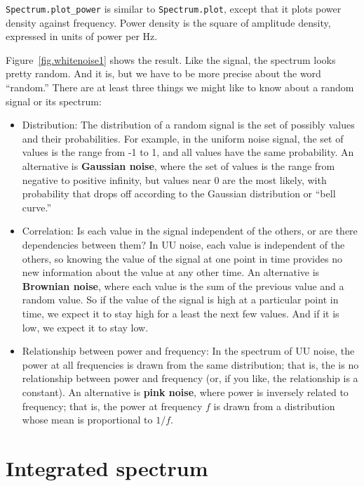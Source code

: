 \documentclass[12pt]{book}
\begin{document}
\verb"Spectrum.plot_power" is similar to \verb"Spectrum.plot",
except that it plots power density against frequency.  Power density
is the square of amplitude density, expressed in units of power per Hz.

Figure~\ref{fig.whitenoise1} shows the result.  Like the signal, the
spectrum looks pretty random.  And it is, but we have to be more
precise about the word ``random.''  There are at least three things we
might like to know about a random signal or its spectrum:

\begin{itemize}

\item Distribution: The distribution of a random signal is the set of
  possibly values and their probabilities.  For example, in the
  uniform noise signal, the set of values is the range from -1 to 1,
  and all values have the same probability.  An alternative is
  {\bf Gaussian noise}, where the set of values is the range from negative
  to positive infinity, but values near 0 are the most likely, with
  probability that drops off according to the Gaussian distribution or
  ``bell curve.''

\item Correlation: Is each value in the signal independent of the
  others, or are there dependencies between them?  In UU noise, each
  value is independent of the others, so knowing the value of the
  signal at one point in time provides no new information about the
  value at any other time.  An alternative is {\bf Brownian noise},
  where each value is the sum of the previous value and a random
  value.  So if the value of the signal is high at a particular point
  in time, we expect it to stay high for a least the next few values.
  And if it is low, we expect it to stay low.

\item Relationship between power and frequency: In the spectrum of UU
  noise, the power at all frequencies is drawn from the same
  distribution; that is, the is no relationship between power and
  frequency (or, if you like, the relationship is a constant).  An
  alternative is {\bf pink noise}, where power is inversely related
  to frequency; that is, the power at frequency $f$ is drawn from
  a distribution whose mean is proportional to $1/f$.

\end{itemize}


\section{Integrated spectrum}
\end{document}
